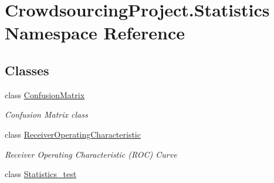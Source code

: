 \hypertarget{namespace_crowdsourcing_project_1_1_statistics}{}\section{Crowdsourcing\+Project.\+Statistics Namespace Reference}
\label{namespace_crowdsourcing_project_1_1_statistics}
\subsection*{Classes}
\begin{DoxyCompactItemize}
\item 
class \hyperlink{class_crowdsourcing_project_1_1_statistics_1_1_confusion_matrix}{Confusion\+Matrix}
\begin{DoxyCompactList}\small\item\em Confusion Matrix class \end{DoxyCompactList}\item 
class \hyperlink{class_crowdsourcing_project_1_1_statistics_1_1_receiver_operating_characteristic}{Receiver\+Operating\+Characteristic}
\begin{DoxyCompactList}\small\item\em Receiver Operating Characteristic (R\+O\+C) Curve \end{DoxyCompactList}\item 
class \hyperlink{class_crowdsourcing_project_1_1_statistics_1_1_statistics__test}{Statistics\+\_\+test}
\end{DoxyCompactItemize}
